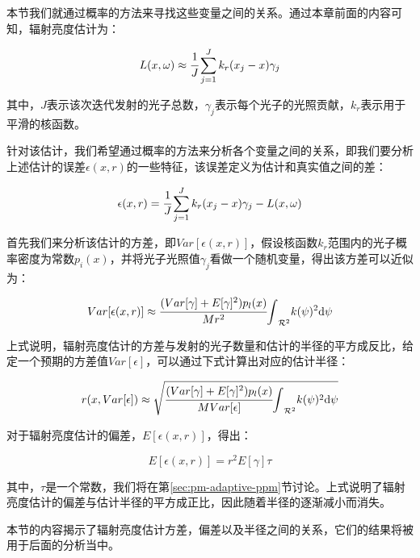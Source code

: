 本节我们就通过概率的方法来寻找这些变量之间的关系。通过本章前面的内容可知，辐射亮度估计为：

\begin{equation}\label{e:pm-pixel-value}
	L(x,\omega)\approx \cfrac{1}{J}\sum^{J}_{j=1}k_r(x_j-x)\gamma_j
\end{equation}

\noindent 其中，$J$表示该次迭代发射的光子总数，$\gamma_j$表示每个光子的光照贡献，$k_r$表示用于平滑的核函数。

针对该估计，我们希望通过概率的方法来分析各个变量之间的关系，即我们要分析上述估计的误差$\epsilon(x,r)$的一些特征，该误差定义为估计和真实值之间的差：

\begin{equation}\label{e:pm-ppm-error}
	\epsilon(x,r)= \cfrac{1}{J}\sum^{J}_{j=1}k_r(x_j-x)\gamma_j-L(x,\omega)
\end{equation}

首先我们来分析该估计的方差，即$Var[\epsilon (x,r)]$，假设核函数$k_r$范围内的光子概率密度为常数$p_i(x)$，并将光子光照值$\gamma_j$看做一个随机变量，\cite{a:ProgressivePhotonMappingAProbabilisticApproach}得出该方差可以近似为：

\begin{equation}
	Var[\epsilon(x,r)]\approx \cfrac{(Var[\gamma]+E[\gamma]^{2})p_l(x)}{Mr^{2}}{\rm \int}_{\mathcal{R}^{2}}k(\psi)^{2}{\rm d}\psi
\end{equation}

上式说明，辐射亮度估计的方差与发射的光子数量和估计的半径的平方成反比，给定一个预期的方差值$Var[\epsilon]$，可以通过下式计算出对应的估计半径：

\begin{equation}
	r(x,Var[\epsilon])\approx\sqrt{ \cfrac{(Var[\gamma]+E[\gamma]^{2})p_l(x)}{MVar[\epsilon]}{\rm \int}_{\mathcal{R}^{2}}k(\psi)^{2}{\rm d}\psi}
\end{equation}

对于辐射亮度估计的偏差，$E[\epsilon (x,r)]$，\cite{a:ProgressivePhotonMappingAProbabilisticApproach}得出：

\begin{equation}
	E[\epsilon (x,r)]=r^{2}E[\gamma]\tau
\end{equation}

其中，$\tau$是一个常数，我们将在第\ref{sec:pm-adaptive-ppm}节讨论。上式说明了辐射亮度估计的偏差与估计半径的平方成正比，因此随着半径的逐渐减小而消失。

本节的内容揭示了辐射亮度估计方差，偏差以及半径之间的关系，它们的结果将被用于后面的分析当中。



